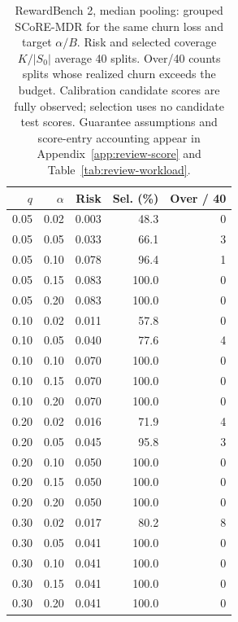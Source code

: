 \begin{table}[t]
\centering\small
\begin{tabular}{rrrrr}
\toprule
$q$ & $\alpha$ & Risk & Sel. (\%) & Over / 40 \\
\midrule
0.05 & 0.02 & 0.003 & 48.3 & 0 \\
0.05 & 0.05 & 0.033 & 66.1 & 3 \\
0.05 & 0.10 & 0.078 & 96.4 & 1 \\
0.05 & 0.15 & 0.083 & 100.0 & 0 \\
0.05 & 0.20 & 0.083 & 100.0 & 0 \\
0.10 & 0.02 & 0.011 & 57.8 & 0 \\
0.10 & 0.05 & 0.040 & 77.6 & 4 \\
0.10 & 0.10 & 0.070 & 100.0 & 0 \\
0.10 & 0.15 & 0.070 & 100.0 & 0 \\
0.10 & 0.20 & 0.070 & 100.0 & 0 \\
0.20 & 0.02 & 0.016 & 71.9 & 4 \\
0.20 & 0.05 & 0.045 & 95.8 & 3 \\
0.20 & 0.10 & 0.050 & 100.0 & 0 \\
0.20 & 0.15 & 0.050 & 100.0 & 0 \\
0.20 & 0.20 & 0.050 & 100.0 & 0 \\
0.30 & 0.02 & 0.017 & 80.2 & 8 \\
0.30 & 0.05 & 0.041 & 100.0 & 0 \\
0.30 & 0.10 & 0.041 & 100.0 & 0 \\
0.30 & 0.15 & 0.041 & 100.0 & 0 \\
0.30 & 0.20 & 0.041 & 100.0 & 0 \\
\bottomrule
\end{tabular}
\caption{RewardBench 2, median pooling: grouped SCoRE-MDR for the same churn loss and target $\alpha/B$. Risk and selected coverage $K/|S_0|$ average 40 splits. Over/40 counts splits whose realized churn exceeds the budget. Calibration candidate scores are fully observed; selection uses no candidate test scores. Guarantee assumptions and score-entry accounting appear in Appendix~\ref{app:review-score} and Table~\ref{tab:review-workload}.}
\label{tab:review-score-0-median}
\end{table}
